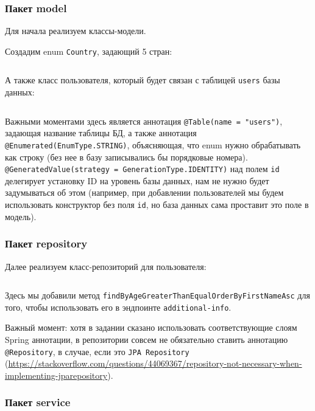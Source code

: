 \documentclass[a4paper, 14pt]{article}
\begin{document}
\subsubsection{Пакет model}

Для начала реализуем классы-модели.

Создадим enum \texttt{Country}, задающий 5 стран:

\normalsize
\inputminted[frame=single]{Java}{../src/main/java/ru/vspochernin/exam/model/Country.java}
\large

А также класс пользователя, который будет связан с таблицей \texttt{users} базы данных:

\normalsize
\inputminted[frame=single]{Java}{../src/main/java/ru/vspochernin/exam/model/User.java}
\large

Важными моментами здесь является аннотация \texttt{@Table(name = "users")}, задающая название таблицы БД, а также аннотация \texttt{@Enumerated(EnumType.STRING)}, объясняющая, что enum нужно обрабатывать как строку (без нее в базу записывались бы порядковые номера). \texttt{@GeneratedValue(strategy = GenerationType.IDENTITY)} над полем \texttt{id} делегирует установку ID на уровень базы данных, нам не нужно будет задумываться об этом (например, при добавлении пользователей мы будем использовать конструктор без поля \texttt{id}, но база данных сама проставит это поле в модель).

\subsubsection{Пакет repository}

Далее реализуем класс-репозиторий для пользователя:

\normalsize
\inputminted[frame=single]{Java}{../src/main/java/ru/vspochernin/exam/repository/UserRepository.java}
\large

Здесь мы добавили метод \texttt{findByAgeGreaterThanEqualOrderByFirstNameAsc} для того, чтобы использовать его в эндпоинте \texttt{additional-info}.

Важный момент: хотя в задании сказано использовать соответствующие слоям Spring аннотации, в репозитории совсем не обязательно ставить аннотацию \texttt{@Repository}, в случае, если это \texttt {JPA Repository} (\url{https://stackoverflow.com/questions/44069367/repository-not-necessary-when-implementing-jparepository}).

\subsubsection{Пакет service}
\end{document}
